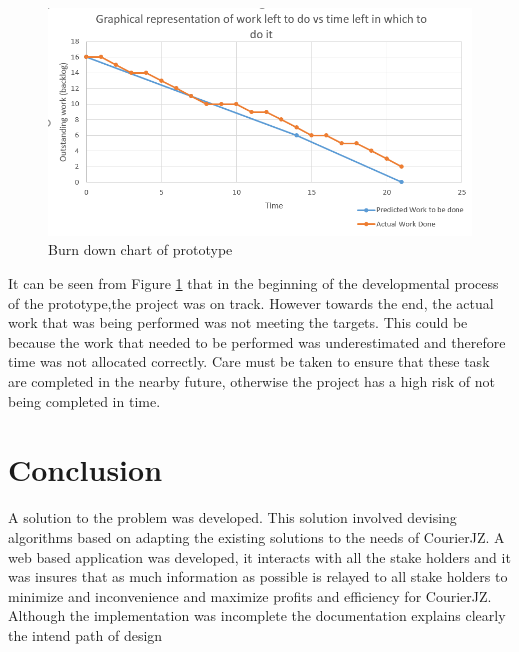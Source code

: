 \documentclass[paper=a4, fontsize=11pt]{scrartcl} %
\numberwithin{equation}{section} %
\numberwithin{figure}{section} %
\numberwithin{table}{section} %
\begin{document}
\begin{figure}[hbt!]
\centering
\includegraphics[width=5in]{pictures/chart.png}
\caption{Burn down chart of prototype}
\label{BurndownChart}
\end{figure}

It can be seen from Figure \ref{BurndownChart} that in the beginning of the developmental process of the prototype,the project was on track. However towards the end, the actual work that was being performed was not meeting the targets. This could be because the work that needed to be performed was underestimated and therefore time was not allocated correctly. Care must be taken to ensure that these task are completed in the nearby future, otherwise the project has a high risk of not being completed in time. 

\section{Conclusion}
A solution to the problem was developed. This solution involved devising algorithms based on adapting the existing solutions to the needs of CourierJZ. A web based application was developed, it interacts with all the stake holders and it was insures that as much information as possible is relayed to all stake holders to minimize and inconvenience and maximize profits and efficiency for CourierJZ. Although the implementation was incomplete the documentation explains clearly the intend path of design

\begin{appendix}
  \listoffigures
  \listoftables
\end{appendix}
\end{document}
